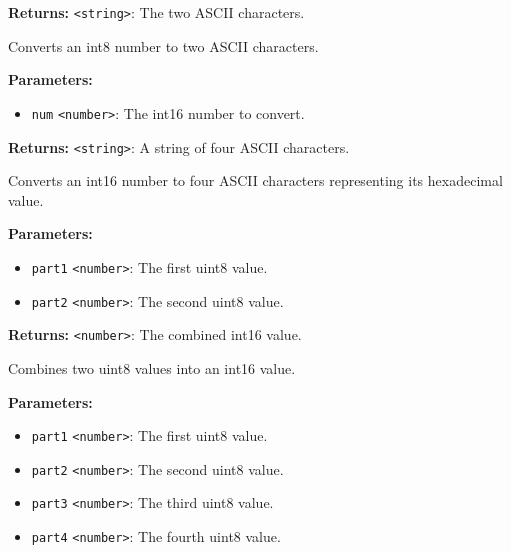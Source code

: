 \documentclass[12pt,a4paper]{article}
\begin{document}
\noindent \textbf{Returns:} \texttt{<string>}: The two ASCII characters.

\noindent Converts an int8 number to two ASCII characters.

\vspace{5mm}
\noindent {}


\noindent \textbf{Parameters:}
\begin{itemize}
  \item \texttt{num} \texttt{<number>}: The int16 number to convert.
\end{itemize}

\noindent \textbf{Returns:} \texttt{<string>}: A string of four ASCII characters.

\noindent Converts an int16 number to four ASCII characters representing its hexadecimal value.

\vspace{5mm}
\noindent {}


\noindent \textbf{Parameters:}
\begin{itemize}
  \item \texttt{part1} \texttt{<number>}: The first uint8 value.
  \item \texttt{part2} \texttt{<number>}: The second uint8 value.
\end{itemize}

\noindent \textbf{Returns:} \texttt{<number>}: The combined int16 value.

\noindent Combines two uint8 values into an int16 value.

\vspace{5mm}
\noindent {}


\noindent \textbf{Parameters:}
\begin{itemize}
  \item \texttt{part1} \texttt{<number>}: The first uint8 value.
  \item \texttt{part2} \texttt{<number>}: The second uint8 value.
  \item \texttt{part3} \texttt{<number>}: The third uint8 value.
  \item \texttt{part4} \texttt{<number>}: The fourth uint8 value.
\end{itemize}
\end{document}
